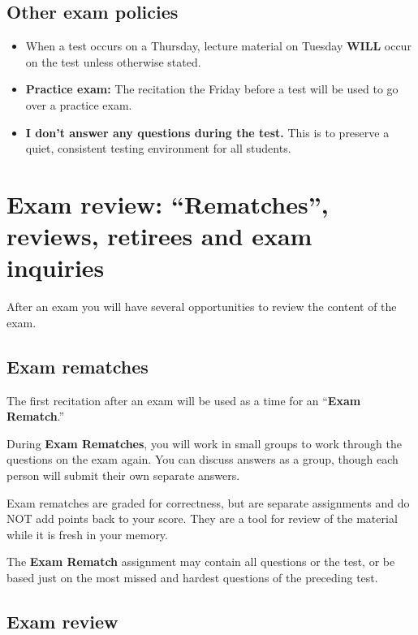 \documentclass[
]{book}
\providecommand{\tightlist}{%
  \setlength{\itemsep}{0pt}\setlength{\parskip}{0pt}}
\begin{document}
\hypertarget{other-exam-policies}{%
\section{Other exam policies}\label{other-exam-policies}}

\begin{itemize}
\tightlist
\item
  When a test occurs on a Thursday, lecture material on Tuesday \textbf{WILL} occur on the test unless otherwise stated.
\item
  \textbf{Practice exam:} The recitation the Friday before a test will be used to go over a practice exam.
\item
  \textbf{I don't answer any questions during the test.} This is to preserve a quiet, consistent testing environment for all students.
\end{itemize}

\hypertarget{exam-review-rematches-reviews-retirees-and-exam-inquiries}{%
\chapter{Exam review: ``Rematches'', reviews, retirees and exam inquiries}\label{exam-review-rematches-reviews-retirees-and-exam-inquiries}}

After an exam you will have several opportunities to review the content of the exam.

\hypertarget{exam-rematches}{%
\section{Exam rematches}\label{exam-rematches}}

The first recitation after an exam will be used as a time for an ``\textbf{Exam Rematch}.''

During \textbf{Exam Rematches}, you will work in small groups to work through the questions on the exam again. You can discuss answers as a group, though each person will submit their own separate answers.

Exam rematches are graded for correctness, but are separate assignments and do NOT add points back to your score. They are a tool for review of the material while it is fresh in your memory.

The \textbf{Exam Rematch} assignment may contain all questions or the test, or be based just on the most missed and hardest questions of the preceding test.

\hypertarget{exam-review}{%
\section{Exam review}\label{exam-review}}
\end{document}
